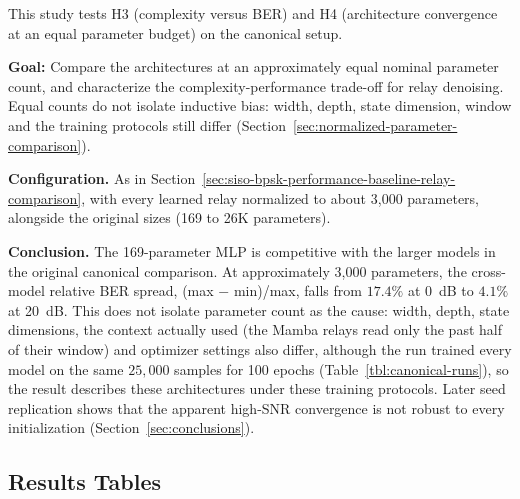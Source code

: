 This study tests H3 (complexity versus BER) and H4 (architecture convergence at an equal parameter budget) on the canonical setup.

\textbf{Goal:} Compare the architectures at an approximately equal nominal parameter count, and characterize the complexity-performance trade-off for relay denoising. Equal counts do not isolate inductive bias: width, depth, state dimension, window and the training protocols still differ (Section~\ref{sec:normalized-parameter-comparison}).

\textbf{Configuration.} As in Section~\ref{sec:siso-bpsk-performance-baseline-relay-comparison}, with every learned relay normalized to about 3{,}000 parameters, alongside the original sizes (169 to 26K parameters).

\textbf{Conclusion.} The 169-parameter MLP is competitive with the larger models in the original canonical comparison. At approximately 3,000 parameters, the cross-model relative BER spread, (max $-$ min)/max, falls from $17.4\%$ at 0~dB to $4.1\%$ at 20~dB. This does not isolate parameter count as the cause: width, depth, state dimensions, the context actually used (the Mamba relays read only the past half of their window) and optimizer settings also differ, although the run trained every model on the same $25{,}000$ samples for 100 epochs (Table~\ref{tbl:canonical-runs}), so the result describes these architectures under these training protocols. Later seed replication shows that the apparent high-SNR convergence is not robust to every initialization (Section~\ref{sec:conclusions}).

\subsection{Results Tables}\label{sec:results-tables-2}


